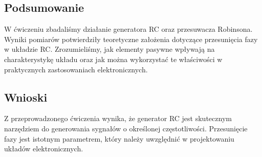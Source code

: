 \documentclass[11pt]{article}
\begin{document}
\subsection*{Podsumowanie}
W ćwiczeniu zbadaliśmy działanie generatora RC oraz przesuwacza Robinsona. Wyniki pomiarów potwierdziły teoretyczne założenia dotyczące przesunięcia fazy w układzie RC.
Zrozumieliśmy, jak elementy pasywne wpływają na charakterystykę układu oraz jak można wykorzystać te właściwości w praktycznych zastosowaniach elektronicznych.
\subsection*{Wnioski}
Z przeprowadzonego ćwiczenia wynika, że generator RC jest skutecznym narzędziem do generowania sygnałów o określonej częstotliwości. 
Przesunięcie fazy jest istotnym parametrem, który należy uwzględnić w projektowaniu układów elektronicznych.
\end{document}
